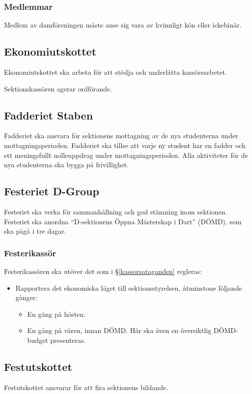 \documentclass{datateknologsektionen-document}
\begin{document}
\subsubsection{Medlemmar}
Medlem av damföreningen måste anse sig vara av kvinnligt kön eller ickebinär.

\subsection{Ekonomiutskottet}
Ekonomiutskottet ska arbeta för att stödja och underlätta kassörsarbetet.

Sektionskassören agerar ordförande.

\subsection{Fadderiet Staben}
Fadderiet ska ansvara för sektionens mottagning av de nya studenterna under mottagningsperioden.
Fadderiet ska tillse att varje ny student har en fadder och ett meningsfullt nolleuppdrag
under mottagningsperioden. Alla aktiviteter för de nya studenterna ska bygga på frivillighet.

\subsection{Festeriet D-Group}
Festeriet ska verka för sammanhållning och god stämning inom sektionen. Festeriet ska
anordna ``D-sektionens Öppna Mästerskap i Dart'' (DÖMD), som ska pågå i tre dagar.

\subsubsection{Festerikassör}
Festerikassören ska utöver det som i \S \ref{kassorsataganden} regleras:
\begin{itemize}
  \item Rapportera det ekonomiska läget till sektionsstyrelsen, åtminstone följande gånger:
        \begin{itemize}
          \item En gång på hösten.
          \item En gång på våren, innan DÖMD. Här ska även en översiktlig DÖMD-budget presenteras.
        \end{itemize}
\end{itemize}

\subsection{Festutskottet}
Festutskottet ansvarar för att fira sektionens bildande.
\end{document}
